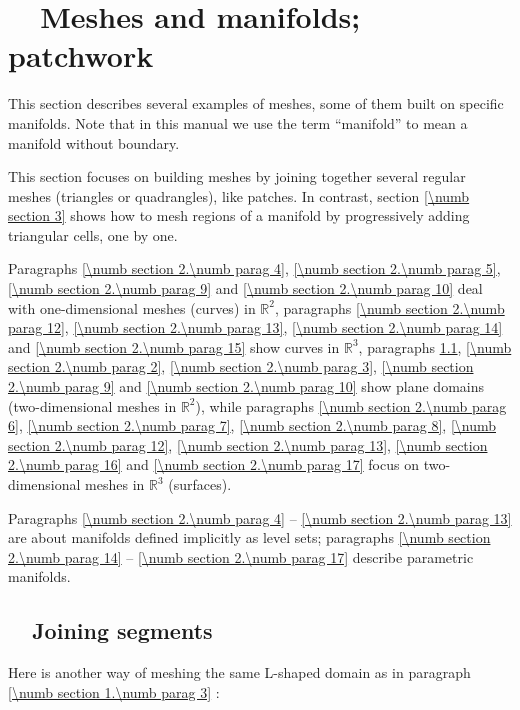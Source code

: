 
\chapter{~~Meshes and manifolds; patchwork}\label{\numb section 2}

This section describes several examples of meshes, some of them built on specific manifolds.
Note that in this manual we use the term ``manifold'' to mean a manifold without boundary.

This section focuses on building meshes by joining together several regular meshes
(triangles or quadrangles), like patches.
In contrast, section \ref{\numb section 3} shows how to mesh regions of a manifold
by progressively adding triangular cells, one by one.

Paragraphs \ref{\numb section 2.\numb parag 4}, \ref{\numb section 2.\numb parag 5},
\ref{\numb section 2.\numb parag 9} and \ref{\numb section 2.\numb parag 10} deal
with one-dimensional meshes (curves) in $ \mathbb{R}^2 $,
paragraphs \ref{\numb section 2.\numb parag 12}, \ref{\numb section 2.\numb parag 13},
\ref{\numb section 2.\numb parag 14} and \ref{\numb section 2.\numb parag 15} show
curves in $ \mathbb{R}^3 $,
paragraphs \ref{\numb section 2.\numb parag 1}, \ref{\numb section 2.\numb parag 2},
\ref{\numb section 2.\numb parag 3}, \ref{\numb section 2.\numb parag 9} and
\ref{\numb section 2.\numb parag 10} show plane domains
(two-dimensional meshes in $ \mathbb{R}^2 $),
while paragraphs \ref{\numb section 2.\numb parag 6}, \ref{\numb section 2.\numb parag 7},
\ref{\numb section 2.\numb parag 8}, \ref{\numb section 2.\numb parag 12},
\ref{\numb section 2.\numb parag 13}, \ref{\numb section 2.\numb parag 16} and
\ref{\numb section 2.\numb parag 17} focus on two-dimensional meshes
in $ \mathbb{R}^3 $ (surfaces).

Paragraphs \ref{\numb section 2.\numb parag 4} -- \ref{\numb section 2.\numb parag 13}
are about manifolds defined implicitly as level sets;
paragraphs \ref{\numb section 2.\numb parag 14} -- \ref{\numb section 2.\numb parag 17}
describe parametric manifolds.


\section{~~Joining segments}\label{\numb section 2.\numb parag 1}

Here is another way of meshing the same L-shaped domain as in paragraph
\ref{\numb section 1.\numb parag 3} :

